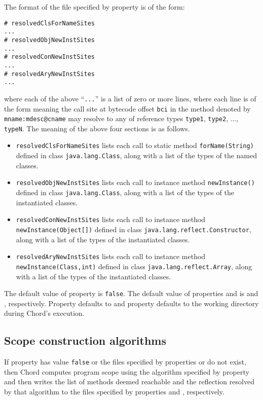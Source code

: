 The format of the file specified by property 
is of the form:
\begin{verbatim}
# resolvedClsForNameSites
...
# resolvedObjNewInstSites
...
# resolvedConNewInstSites
...
# resolvedAryNewInstSites
...
\end{verbatim}
where each of the above ``{\tt ...}'' is a list of zero or more lines, where
each line is of the form
meaning the call site at bytecode offset {\tt bci} in the
method denoted by {\tt mname:mdesc@cname} may resolve to any of
reference types {\tt type1}, {\tt type2}, ..., {\tt typeN}.
The meaning of the above four sections is as follows.
\begin{itemize}
\item {\tt resolvedClsForNameSites} lists
each call to static method {\tt forName(String)} defined in class
{\tt java.lang.Class}, along with a list of the types of the named
classes.
\item {\tt resolvedObjNewInstSites} lists
each call to instance method {\tt newInstance()} defined in class
{\tt java.lang.Class}, along with a list of the types of the
instantiated classes.
\item {\tt resolvedConNewInstSites} lists
each call to instance method {\tt newInstance(Object[])} defined in class
{\tt java.lang.reflect.Constructor}, along with a list of the types of the
instantiated classes.
\item {\tt resolvedAryNewInstSites} lists
each call to instance method {\tt newInstance(Class,int)} defined in class
{\tt java.lang.reflect.Array}, along with a list of the types of the
instantiated classes.
\end{itemize}
The default value of property  is {\tt false}.
The default value of properties  and
 is  and
, respectively.
Property  defaults to
 and property
 defaults to the working directory during Chord's
execution.

\subsection{Scope construction algorithms}

If property  has value {\tt false} or the
files specified by properties  or
 do not exist, then Chord computes program
scope using the algorithm specified by property
 and then writes the list of methods deemed
reachable and the reflection resolved by that algorithm to the files
specified by properties  and
, respectively.

